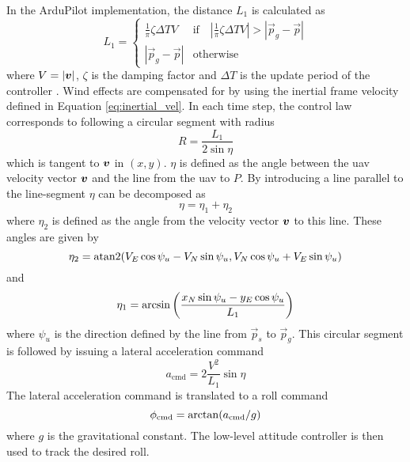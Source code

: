 In the ArduPilot implementation, the distance $L_1$ is calculated as
\begin{equation}\label{eq:ardu_l1}
    L_1=\begin{cases}
        \frac{1}{\pi}\zeta\Delta TV & \mbox{if}\quad |\frac{1}{\pi}\zeta\Delta TV|>|\vec{p}_g-\vec{p}| \\
        |\vec{p}_g-\vec{p}| & \mbox{otherwise}
    \end{cases}
\end{equation}
where $V=|\boldsymbol{v}|$, $\zeta$ is the damping factor and $\Delta T$ is the update period of the controller \cite{arduplane_l1}.
Wind effects are compensated for by using the inertial frame velocity defined in Equation \eqref{eq:inertial_vel}. In each time step, the control law corresponds to following a circular segment with radius
 \begin{equation}
    R=\frac{L_1}{2\sin\eta}
 \end{equation}
 which is tangent to $\boldsymbol{v}$ in $(x,y)$.
 $\eta$ is defined as the angle between the \ac{uav} velocity vector $\boldsymbol{v}$ and the line from the \ac{uav} to $P$. By introducing a line parallel to the line-segment $\eta$ can be decomposed as
\begin{equation}\label{eq:eta_first}
    \eta=\eta_1+\eta_2
\end{equation}
where $\eta_2$ is defined as the angle from the velocity vector $\boldsymbol{v}$ to this line.
These angles are given by 
\begin{equation}
    \eta_2=\atan2(V_E\cos\psi_u - V_N\sin\psi_u,V_N\cos\psi_u+V_E\sin\psi_u)
\end{equation}
and 
\begin{equation}\label{eq:eta_last}
    \eta_1=\operatorname*{arcsin}\left(\frac{x_N\sin\psi_u-y_E\cos\psi_u}{L_1}\right)
\end{equation}
where $\psi_u$ is the direction defined by the line from $\vec{p}_s$ to $\vec{p}_g$.
This circular segment is followed by issuing a lateral acceleration command
\begin{equation}\label{eq:lat_acc}
    a_{\text{cmd}}=2\frac{V^2}{L_1}\sin\eta
\end{equation}
The lateral acceleration command is translated to a roll command
\begin{equation}\label{eq:roll_cmd}
    \phi_{\text{cmd}}=\operatorname*{arctan}(a_{\text{cmd}}/g)
\end{equation}
where $g$ is the gravitational constant. The low-level attitude controller is then used to track the desired roll.

